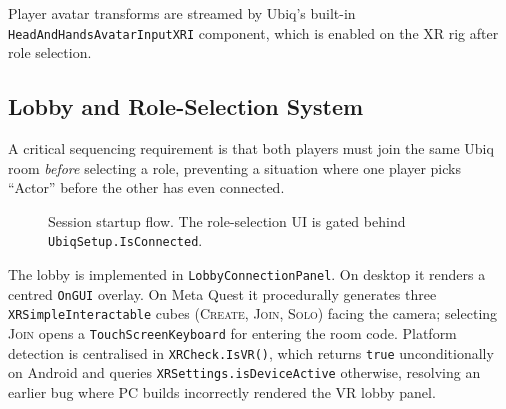 \documentclass[12pt,a4paper]{article}
\newcommand{\code}[1]{\texttt{#1}}
\begin{document}
Player avatar transforms are streamed by Ubiq's built-in \code{HeadAndHandsAvatarInputXRI} component, which is enabled on the XR rig after role selection.

\subsection{Lobby and Role-Selection System}

A critical sequencing requirement is that both players must join the same Ubiq room \emph{before} selecting a role, preventing a situation where one player picks ``Actor'' before the other has even connected.

\begin{figure}[H]
\centering
{}
\caption{Session startup flow. The role-selection UI is gated behind \code{UbiqSetup.IsConnected}.}
\label{fig:flow}
\end{figure}

The lobby is implemented in \code{LobbyConnectionPanel}. On desktop it renders a centred \code{OnGUI} overlay. On Meta Quest it procedurally generates three \code{XRSimpleInteractable} cubes (\textsc{Create}, \textsc{Join}, \textsc{Solo}) facing the camera; selecting \textsc{Join} opens a \code{TouchScreenKeyboard} for entering the room code. Platform detection is centralised in \code{XRCheck.IsVR()}, which returns \code{true} unconditionally on Android and queries \code{XRSettings.isDeviceActive} otherwise, resolving an earlier bug where PC builds incorrectly rendered the VR lobby panel.
\end{document}
